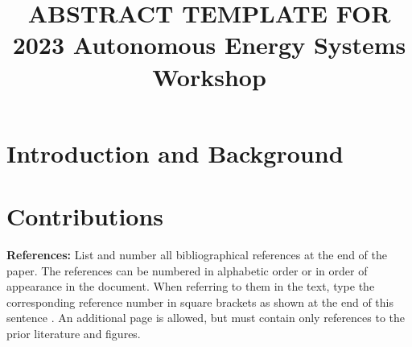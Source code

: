 \documentclass{article}
\title{ABSTRACT TEMPLATE FOR 2023 Autonomous Energy Systems Workshop}
\begin{document}
%
\maketitle
%

\section{Introduction and Background}
\label{sec:intro}

\lipsum[1]

\section{Contributions}
\label{sec:contributions}

\lipsum[1]

{\bf References:}
List and number all bibliographical references at the end of the
paper. The references can be numbered in alphabetic order or in
order of appearance in the document. When referring to them in
the text, type the corresponding reference number in square
brackets as shown at the end of this sentence \cite{C2}. An
additional page is allowed, but must contain only references to the prior literature and figures.



\end{document}
